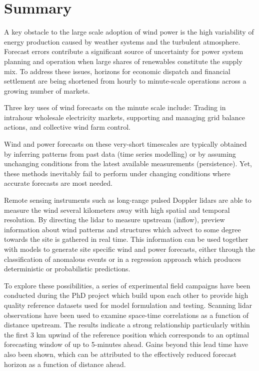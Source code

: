 \chapter{Summary}
\label{sec:summary}


A key obstacle to the large scale adoption of wind power is the high variability of energy production caused by weather systems and the turbulent atmosphere. Forecast errors contribute a significant source of uncertainty for power system planning and operation when large shares of renewables constitute the supply mix. To address these issues, horizons for economic dispatch and financial settlement are being shortened from hourly to minute-scale operations across a growing number of markets.

Three key uses of wind forecasts on the minute scale include: Trading in intrahour wholesale electricity markets, supporting and managing grid balance actions, and collective wind farm control.

Wind and power forecasts on these very-short timescales are typically obtained by inferring patterns from past data (time series modelling) or by assuming unchanging conditions from the latest available measurements (persistence). Yet, these methods inevitably fail to perform under changing conditions where accurate forecasts are most needed. %

Remote sensing instruments such as long-range pulsed Doppler lidars are able to measure the wind several kilometers away with high spatial and temporal resolution. By directing the lidar to measure upstream (inflow), preview information about wind patterns and structures which advect to some degree towards the site is gathered in real time. This information can be used together with models to generate site specific wind and power forecasts, either through the classification of anomalous events or in a regression approach which produces deterministic or probabilistic predictions.

To explore these possibilities, a series of experimental field campaigns have been conducted during the PhD project which build upon each other to provide high quality reference datasets used for model formulation and testing. Scanning lidar observations have been used to examine space-time correlations as a function of distance upstream. The results indicate a strong relationship particularly within the first 3 km upwind of the reference position which corresponds to an optimal forecasting window of up to 5-minutes ahead. Gains beyond this lead time have also been shown, which can be attributed to the effectively reduced forecast horizon as a function of distance ahead.

